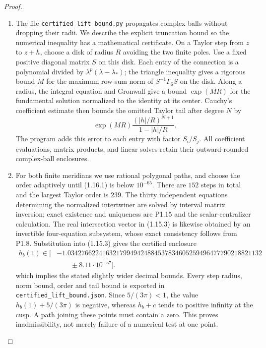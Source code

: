 \documentclass[11pt,a4paper]{article}
\theoremstyle{definition}
\begin{document}
\begin{proof}
\begin{enumerate}[label=\arabic*.]
\item The file \texttt{certified\_lift\_bound.py} propagates complex balls
without dropping their radii.  We describe the explicit truncation
bound so the numerical inequality has a mathematical certificate.
On a Taylor step from $z$ to $z+h$, choose a disk of radius $R$ avoiding
the two finite poles.  Use a fixed positive diagonal matrix $S$ on
this disk.  Each entry of the connection is a polynomial divided by
$\lambda^p(\lambda-\lambda_*)$; the triangle inequality gives a
rigorous bound $M$ for the maximum row-sum norm of
$S^{-1}\Gamma_6S$ on the disk.  Along a radius, the integral equation
and Gronwall give a bound $\exp(MR)$ for the fundamental solution
normalized to the identity at its center.  Cauchy's coefficient
estimate then bounds the omitted Taylor tail after degree $N$ by
\[
\exp(MR)\frac{(|h|/R)^{N+1}}{1-|h|/R}.
\tag{1.16.1}
\]
The program adds this error to each entry with factor $S_i/S_j$.
All coefficient evaluations, matrix products, and linear solves retain
their outward-rounded complex-ball enclosures.

\item For both finite meridians we use rational polygonal paths, and choose
the order adaptively until (1.16.1) is below $10^{-65}$.
There are $152$ steps in total and the largest Taylor order is $239$.
The thirty independent equations determining the normalized
intertwiner are solved by interval matrix inversion; exact existence
and uniqueness are P1.15 and the scalar-centralizer calculation.
The real intersection vector in (1.15.3) is likewise obtained by an
invertible four-equation subsystem, whose exact consistency follows
from P1.8.  Substitution into (1.15.3) gives the certified enclosure
\[
\begin{aligned}
h_b(1)\in\bigl[&
-1.03427662241632179949424884537834605259496477790218821132\\
&\qquad\mathbin{\pm}8.11\cdot10^{-57}\bigr].
\end{aligned}
\]
which implies the stated slightly wider decimal bounds.
Every step radius, norm bound, order and tail bound is exported in
\texttt{certified\_lift\_bound.json}.  Since $5/(3\pi)<1$, the value
$h_b(1)+5/(3\pi)$ is negative, whereas $h_b+c$ tends to positive
infinity at the cusp.  A path joining these points must contain a
zero.  This proves inadmissibility, not merely failure of a numerical
test at one point.


\end{enumerate}
\end{proof}
\end{document}
